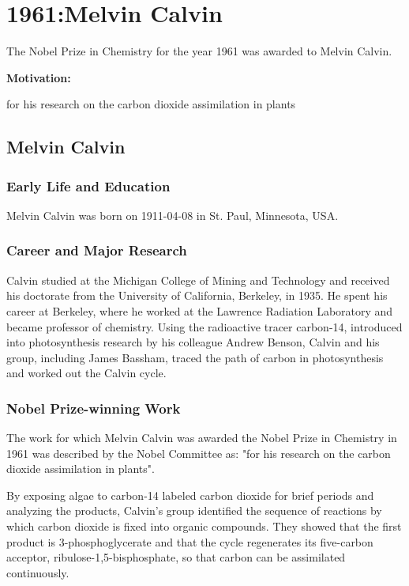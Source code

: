 \chapter{1961:Melvin Calvin}

\label{chap:chemistry1961}

The Nobel Prize in Chemistry for the year 1961 was awarded to Melvin Calvin.

\textbf{Motivation:}

for his research on the carbon dioxide assimilation in plants

\section{Melvin Calvin}

\subsection*{Early Life and Education}

Melvin Calvin was born on 1911-04-08 in St. Paul, Minnesota, USA.

\subsection*{Career and Major Research}

Calvin studied at the Michigan College of Mining and Technology and received his doctorate from the University of California, Berkeley, in 1935. He spent his career at Berkeley, where he worked at the Lawrence Radiation Laboratory and became professor of chemistry. Using the radioactive tracer carbon-14, introduced into photosynthesis research by his colleague Andrew Benson, Calvin and his group, including James Bassham, traced the path of carbon in photosynthesis and worked out the Calvin cycle.

\subsection*{Nobel Prize-winning Work}

The work for which Melvin Calvin was awarded the Nobel Prize in Chemistry in 1961 was described by the Nobel Committee as: "for his research on the carbon dioxide assimilation in plants".

By exposing algae to carbon-14 labeled carbon dioxide for brief periods and analyzing the products, Calvin's group identified the sequence of reactions by which carbon dioxide is fixed into organic compounds. They showed that the first product is 3-phosphoglycerate and that the cycle regenerates its five-carbon acceptor, ribulose-1,5-bisphosphate, so that carbon can be assimilated continuously.

